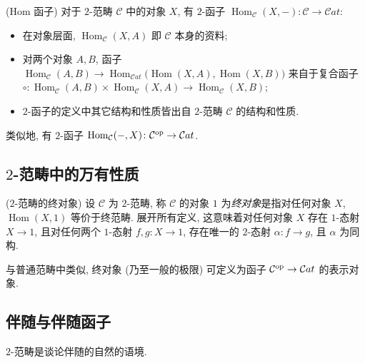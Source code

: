 
\begin{example}
	{(Hom 函子)}
	对于 $2$-范畴 $\mathcal C$ 中的对象 $X$, 有 $2$-函子 $\operatorname{Hom}_{\mathcal C}(X,-)\colon \mathcal C\to\mathcal Cat$:
	\begin{itemize}
		\item 在对象层面, $\operatorname{Hom}_{\mathcal C}(X,A)$ 即 $\mathcal C$ 本身的资料;
		\item 对两个对象 $A,B$, 函子 $\operatorname{Hom}_{\mathcal C}(A,B)\to\operatorname{Hom}_{\mathcal Cat}\big({\operatorname{Hom}(X,A),\operatorname{Hom}(X,B)}\big)$ 来自于复合函子 $\circ\colon \operatorname{Hom}_{\mathcal C}(A,B)\times \operatorname{Hom}_{\mathcal C}(X,A) \to \operatorname{Hom}_{\mathcal C}(X,B)$;
		\item $2$-函子的定义中其它结构和性质皆出自 $2$-范畴 $\mathcal C$ 的结构和性质.
	\end{itemize}
	类似地, 有 $2$-函子 $\operatorname{Hom}_{\mathcal C}(-,X)\colon \mathcal C^{\text{op}}\to \mathcal Cat$.
\end{example}

\subsection{$2$-范畴中的万有性质}

\begin{propdef}
	{($2$-范畴的终对象)}
	设 $\mathcal C$ 为 $2$-范畴, 称 $\mathcal C$ 的对象 $1$ 为\emph{终对象}是指对任何对象 $X$,
	$\operatorname{Hom}(X,1)$ 等价于终范畴.
	展开所有定义, 这意味着对任何对象 $X$ 存在 $1$-态射 $X\to 1$,
	且对任何两个 $1$-态射 $f,g\colon X\to 1$, 存在唯一的 $2$-态射 $\alpha\colon f\to g$,
	且 $\alpha$ 为同构.
	
	与普通范畴中类似, 终对象 (乃至一般的极限) 可定义为函子 $\mathcal C^{\text{op}}\to\mathcal Cat$ 的表示对象.
\end{propdef}



\subsection{伴随与伴随函子}

$2$-范畴是谈论伴随的自然的语境.

\newcommand{\adj}[4]{
\begin{tikzcd}[ampersand replacement=\&]
	{#3} \& {#4}
	\arrow[""{name=0, anchor=center, inner sep=0}, "#1"', shift right=2, from=1-2, to=1-1]
	\arrow[""{name=1, anchor=center, inner sep=0}, "#2"', shift right=2, from=1-1, to=1-2]
	\arrow["\dashv"{anchor=center, rotate=-90}, draw=none, from=0, to=1]
\end{tikzcd}
}

